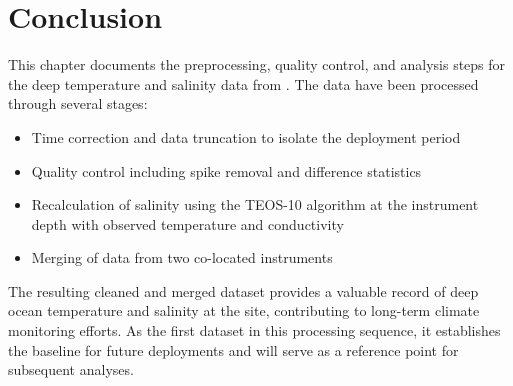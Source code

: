 \section{Conclusion}
This chapter documents the preprocessing, quality control, and analysis steps 
for the deep temperature and salinity data from \projectname{} \casenumber{}. 
The data have been processed through several stages:

\begin{itemize}
    \item Time correction and data truncation to isolate the deployment period
    \item Quality control including spike removal and difference statistics
    \item Recalculation of salinity using the TEOS-10 algorithm at the instrument depth with observed temperature and conductivity
    \item Merging of data from two co-located instruments
\end{itemize}

The resulting cleaned and merged dataset provides a valuable record of deep ocean temperature and salinity 
at the \projectname{} site, contributing to long-term climate monitoring efforts. As the first dataset in this 
processing sequence, it establishes the baseline for future deployments and will serve as a reference point for 
subsequent analyses.
